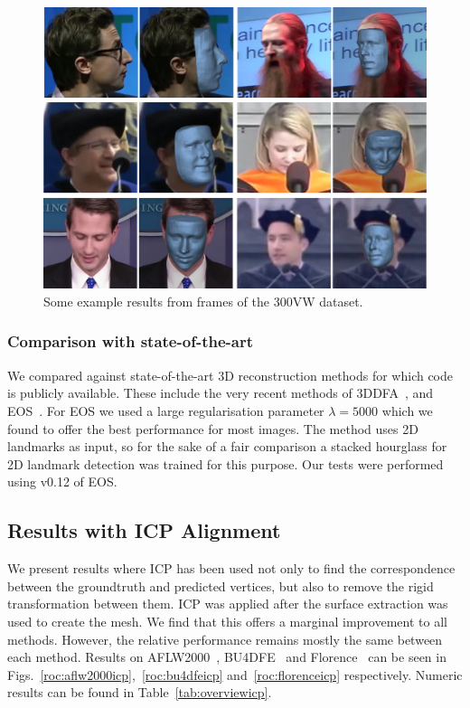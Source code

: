 \begin{figure}
  \centering
  \includegraphics[width=0.9\linewidth]{img/300vw.png}
  \caption[Visual results on the 300VW dataset]{Some example results
    from frames of the 300VW dataset.}
  \label{fig:face300vw}
\end{figure}


\subsubsection{Comparison with state-of-the-art}
We compared against state-of-the-art 3D reconstruction methods for
which code is publicly available. These include the very recent
methods of 3DDFA~\cite{zhu2016face}, and
EOS~\cite{huber2016multiresolution}. For EOS we used a large
regularisation parameter $\lambda = 5000$ which we found to offer the
best performance for most images. The method uses 2D landmarks as
input, so for the sake of a fair comparison a stacked hourglass for 2D
landmark detection was trained for this purpose. Our tests were
performed using v0.12 of EOS.


\subsection{Results with ICP Alignment}
\label{sec:faceicpres}

We present results where ICP has been used not only to find the
correspondence between the groundtruth and predicted vertices, but
also to remove the rigid transformation between them. ICP was applied
after the surface extraction was used to create the mesh. We find that
this offers a marginal improvement to all methods. However, the
relative performance remains mostly the same between each
method. Results on AFLW2000~\cite{zhu2016face},
BU4DFE~\cite{yin2008high} and Florence~\cite{masi2d3dFaceData} can be
seen in Figs.~\ref{roc:aflw2000icp},~\ref{roc:bu4dfeicp}
and~\ref{roc:florenceicp} respectively. Numeric results can be found
in Table~\ref{tab:overviewicp}.

